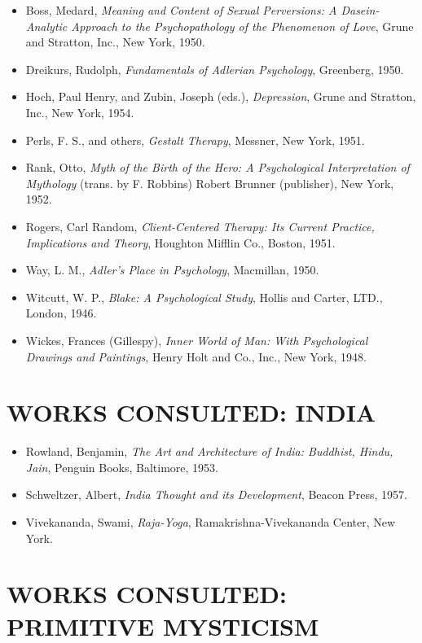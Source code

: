\begin{itemize}
	\item Boss, Medard, \textit{Meaning and Content of Sexual Perversions: A Dasein-Analytic Approach to the Psychopathology of the Phenomenon of Love}, Grune and Stratton, Inc., New York, 1950.
	\item Dreikurs, Rudolph, \textit{Fundamentals of Adlerian Psychology}, Greenberg, 1950.
	\item Hoch, Paul Henry, and Zubin, Joseph (eds.), \textit{Depression}, Grune and Stratton, Inc., New York, 1954.
	\item Perls, F. S., and others, \textit{Gestalt Therapy}, Messner, New York, 1951.
	\item Rank, Otto, \textit{Myth of the Birth of the Hero: A Psychological Interpretation of Mythology} (trans. by F. Robbins) Robert Brunner (publisher), New York, 1952.
	\item Rogers, Carl Random, \textit{Client-Centered Therapy: Its Current Practice, Implications and Theory}, Houghton Mifflin Co., Boston, 1951.
	\item Way, L. M., \textit{Adler's Place in Psychology}, Macmillan, 1950.
	\item Witcutt, W. P., \textit{Blake: A Psychological Study}, Hollis and Carter, LTD., London, 1946.
	\item Wickes, Frances (Gillespy), \textit{Inner World of Man: With Psychological Drawings and Paintings}, Henry Holt and Co., Inc., New York, 1948.
\end{itemize}

\section*{\centering WORKS CONSULTED: INDIA}

\begin{itemize}
	\item Rowland, Benjamin, \textit{The Art and Architecture of India: Buddhist, Hindu, Jain}, Penguin Books, Baltimore, 1953.
	\item Schweltzer, Albert, \textit{India Thought and its Development}, Beacon Press, 1957.
	\item Vivekananda, Swami, \textit{Raja-Yoga}, Ramakrishna-Vivekananda Center, New York.
\end{itemize}

\section*{\centering WORKS CONSULTED: PRIMITIVE MYSTICISM}

